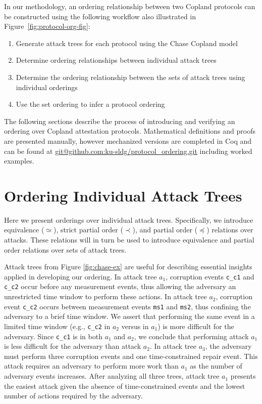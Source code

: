 \documentclass[runningheads]{llncs}
\theoremstyle{definition}
\newcommand{\squash}{\itemsep=0pt\parskip=0pt}
\begin{document}
In our methodology, an ordering relationship between two Copland
protocols can be constructed using the following workflow also
illustrated in Figure~\ref{fig:protocol-org-fig}:

\begin{enumerate}
  \squash
\item Generate attack trees for each protocol using the Chase Copland model
\item Determine ordering relationships between individual attack trees
\item Determine the ordering relationship between the sets of attack
  trees using individual orderings
\item Use the set ordering to infer a protocol ordering
\end{enumerate}

The following sections describe the process of introducing and
verifying an ordering over Copland attestation protocols. 
Mathematical definitions and proofs are presented manually, however
mechanized versions are completed in Coq and can be found at
\url{git@github.com:ku-sldg/protocol_ordering.git} including worked
examples. 

\section{Ordering Individual Attack Trees}

Here we present orderings over individual attack trees. Specifically,
we introduce equivalence ($\simeq$), strict partial order ($\prec$),
and partial order ($\preceq$) relations over attacks. These
relations will in turn be used to introduce equivalence and partial
order relations over sets of attack trees.

Attack trees from Figure \ref{fig:chase-ex} are useful for describing
essential insights applied in developing our ordering. In attack tree
$a_1$, corruption events \texttt{c\_c1} and \texttt{c\_c2} occur
before any measurement events, thus allowing the adversary an
unrestricted time window to perform these actions. In
attack tree $a_2$, corruption event \texttt{c\_c2} occurs between
measurement events \texttt{ms1} and \texttt{ms2}, thus confining the
adversary to a brief time window. We
assert that performing the same event in a limited time window (e.g.,
\texttt{c\_c2} in $a_2$ versus in $a_1$) is more difficult for the
adversary. Since \texttt{c\_c1} is in both $a_1$ and $a_2$, we
conclude that performing attack $a_1$ is less difficult for the
adversary than attack $a_2$.  In attack tree $a_3$, the adversary must
perform three corruption events and one time-constrained repair
event. This attack requires an adversary to perform more work than
$a_1$ as the number of adversary events increases. After analyzing all
three trees, attack tree $a_1$ presents the easiest attack given the
absence of time-constrained events and the lowest number of actions
required by the adversary.
\end{document}

